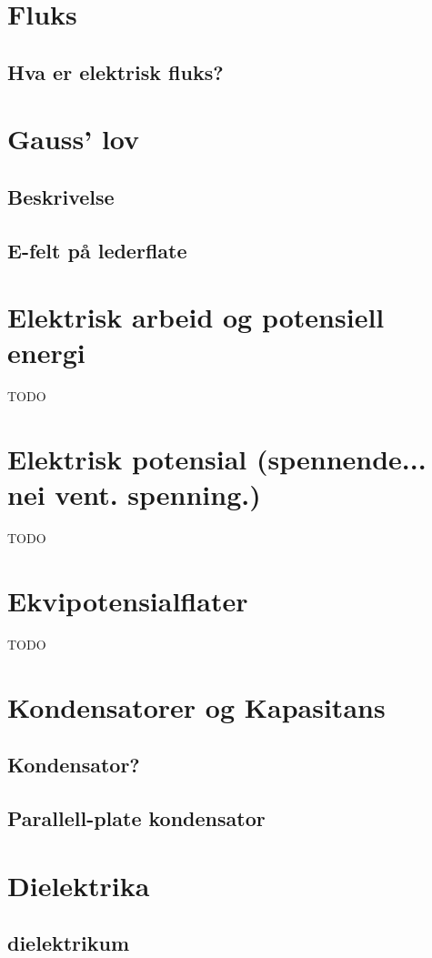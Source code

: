 \documentclass{article}
\begin{document}
  \section{Fluks}
    \subsection{Hva er elektrisk fluks?}
      
  \section{Gauss' lov}
    \subsection{Beskrivelse}
      
    \subsection{E-felt på lederflate}
      
  \section{Elektrisk arbeid og potensiell energi}
    TODO
  \section{Elektrisk potensial (spennende... nei vent. spenning.)}
    TODO
  \section{Ekvipotensialflater}
    TODO
  \section{Kondensatorer og Kapasitans}
    \subsection{Kondensator?}
      
    \subsection{Parallell-plate kondensator}
      
  \section{Dielektrika}
    \subsection{dielektrikum}
      
\end{document}
